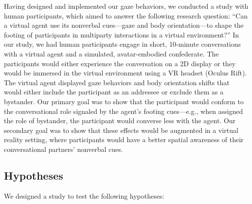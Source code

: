 Having designed and implemented our gaze behaviors, we conducted a study with human participants, which aimed to answer the following research question: ``Can a virtual agent use its nonverbal cues---gaze and body orientation---to shape the footing of participants in multiparty interactions in a virtual environment?'' In our study, we had human participants engage in short, 10-minute conversations with a virtual agent and a simulated, avatar-embodied confederate. The participants would either experience the conversation on a 2D display or they would be immersed in the virtual environment using a VR headset (Oculus Rift). The virtual agent displayed gaze behaviors and body orientation shifts that would either include the participant as an addressee or exclude them as a bystander. Our primary goal was to show that the participant would conform to the conversational role signaled by the agent's footing cues---e.g., when assigned the role of bystander, the participant would converse less with the agent. Our secondary goal was to show that these effects would be augmented in a virtual reality setting, where participants would have a better spatial awareness of their conversational partners' nonverbal cues.

\subsection{Hypotheses}

We designed a study to test the following hypotheses:

